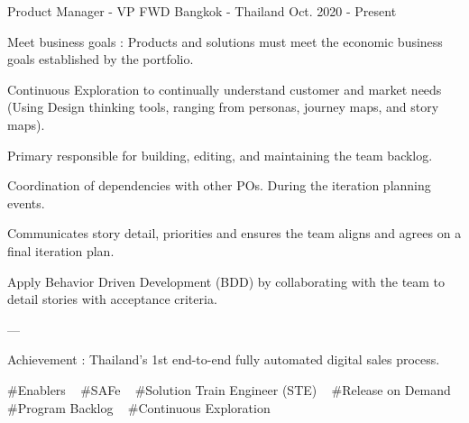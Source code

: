 

\begin{cventries}

  \cventry
    {Product Manager - VP} %
    {FWD} %
    {Bangkok - Thailand} %
    {Oct. 2020 - Present} %
    {
      \begin{cvitems} %
        \item {Meet business goals : Products and solutions must meet the economic business goals established by the portfolio.}
        \item {Continuous Exploration to continually understand customer and market needs (Using Design thinking tools, ranging from personas, journey maps, and story maps).}
        \item {Primary responsible for building, editing, and maintaining the team backlog.}
        \item {Coordination of dependencies with other POs. During the iteration planning events.}
        \item {Communicates story detail, priorities and ensures the team aligns and agrees on a final iteration plan.}
        \item {Apply Behavior Driven Development (BDD) by collaborating with the team to detail stories with acceptance criteria.}
        \item {---}
        \item {Achievement : Thailand's 1st end-to-end fully automated digital sales process.}
      \end{cvitems}
    }
    {
      \#Enablers ~
      \#SAFe ~
      \#Solution Train Engineer (STE) ~
      \#Release on Demand ~
      \#Program Backlog ~
      \#Continuous Exploration ~
    }


\end{cventries}
